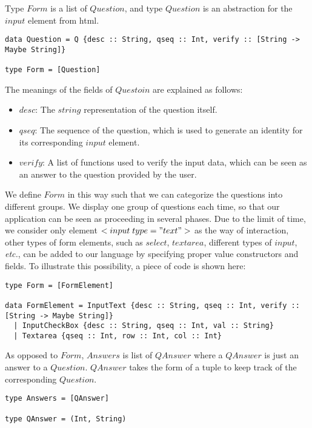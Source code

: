 \documentclass[10pt]{article}
\begin{document}
Type $Form$ is a list of $Question$, and type $Question$ is an abstraction for the $input$ element from html.
\begin{lstlisting}
data Question = Q {desc :: String, qseq :: Int, verify :: [String -> Maybe String]}

type Form = [Question] 
\end{lstlisting}
The meanings of the fields of $Questoin$ are explained as follows:
\begin{itemize}
\item $desc$: The $string$ representation of the question itself.
\item $qseq$: The sequence of the question, which is used to generate an identity for its corresponding $input$ element.
\item $verify$: A list of functions used to verify the input data, which can be seen as an answer to the question provided by the user.
\end{itemize}
We define $Form$ in this way such that we can categorize the questions into different groups. We display one group of questions each time, so that our application can be seen as proceeding in several phases. Due to the limit of time, we consider only element $<input\; type="text">$  as the way of interaction, other types of form elements, such as $select$, $textarea$, different types of $input$, \textit{etc.}, can be added to our language by specifying proper value constructors and fields. To illustrate this possibility, a piece of code is shown here:
\begin{lstlisting}
type Form = [FormElement]                                                                                                                                                                     
                                                                                                                                                                                              
data FormElement = InputText {desc :: String, qseq :: Int, verify :: [String -> Maybe String]}                                                                                                
  | InputCheckBox {desc :: String, qseq :: Int, val :: String}                                                                                                                                
  | Textarea {qseq :: Int, row :: Int, col :: Int}
\end{lstlisting}

As opposed to $Form$, $Answers$ is list of $QAnswer$ where a $QAnswer$ is just an answer to a $Question$. $QAnswer$ takes the form of a tuple to keep track of the corresponding $Question$.
\begin{lstlisting}
type Answers = [QAnswer]

type QAnswer = (Int, String)
\end{lstlisting}
\end{document}
